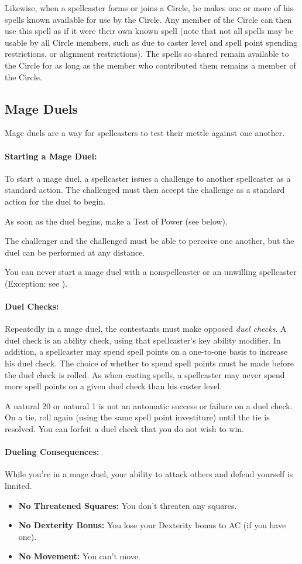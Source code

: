 Likewise, when a spellcaster forms or joins a Circle, he makes one or more of his spells known available for use by the Circle. Any member of the Circle can then use this spell as if it were their own known spell (note that not all spells may be usable by all Circle members, such as due to caster level and spell point spending restrictions, or alignment restrictions). The spells so shared remain available to the Circle for as long as the member who contributed them remains a member of the Circle.
\subsection{Mage Duels}
\label{sec:MageDuels}
Mage duels are a way for spellcasters to test their mettle against one another.

\paragraph{Starting a Mage Duel:} To start a mage duel, a spellcaster issues a challenge to another spellcaster as a standard action. The challenged must then accept the challenge as a standard action for the duel to begin.

As soon as the duel begins, make a Test of Power (see below).

The challenger and the challenged must be able to perceive one another, but the duel can be performed at any distance.

You can never start a mage duel with a nonspellcaster or an unwilling spellcaster (Exception: see ).
\paragraph{Duel Checks:} Repeatedly in a mage duel, the contestants must make opposed \emph{duel checks}. A duel check is an ability check, using that spellcaster's key ability modifier. In addition, a spellcaster may spend spell points on a one-to-one basis to increase his duel check. The choice of whether to spend spell points must be made before the duel check is rolled. As when casting spells, a spellcaster may never spend more spell points on a given duel check than his caster level.

A natural 20 or natural 1 is not an automatic success or failure on a duel check. On a tie, roll again (using the same spell point investiture) until the tie is resolved. You can forfeit a duel check that you do not wish to win.
\paragraph{Dueling Consequences:} While you're in a mage duel, your ability to attack others and defend yourself is limited.
\begin{itemize}
 \item \textbf{No Threatened Squares:} You don't threaten any squares.
 \item \textbf{No Dexterity Bonus:} You lose your Dexterity bonus to AC (if you have one).
 \item \textbf{No Movement:} You can't move.
\end{itemize}

